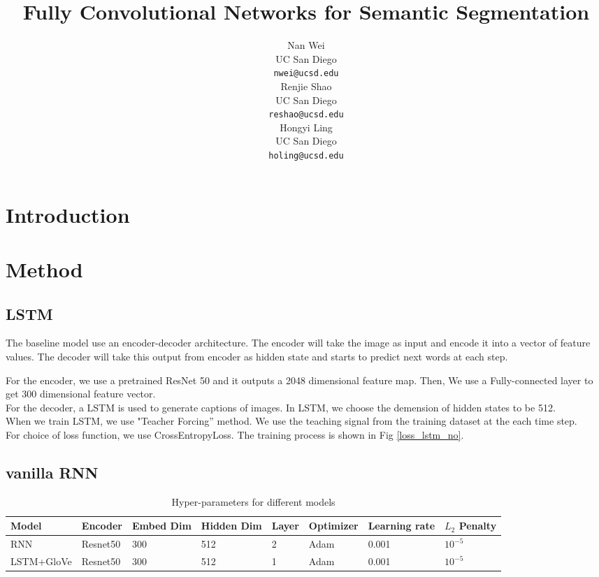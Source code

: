 \documentclass{article} %
\title{Fully Convolutional Networks for Semantic
Segmentation}
\author{
Nan Wei \\
UC San Diego\\
\texttt{nwei@ucsd.edu} \\
\And
Renjie Shao \\
UC San Diego \\
\texttt{reshao@ucsd.edu} \\
\And
Hongyi Ling \\
UC San Diego \\
\texttt{holing@ucsd.edu} \\
}
\begin{document}
\maketitle

\begin{abstract}

\end{abstract}

\section{Introduction}


\section{Method}
\subsection{LSTM}
The baseline model use an encoder-decoder architecture. 
The encoder will take the image as input and encode it into a vector of feature values.
 The decoder will take this output from encoder as hidden state and starts to predict next words at each step.

 For the encoder, we use a pretrained ResNet 50 and it outputs a  2048 dimensional feature map. Then, We use a Fully-connected layer to get 300 dimensional feature vector. \\
 For the decoder, a LSTM is used to generate captions of images. In LSTM, we choose the demension of hidden states to be 512. \\
 When we train LSTM, we use "Teacher Forcing” method. We use the teaching signal from the training dataset at the each time step.\\
 For choice of loss function, we use CrossEntropyLoss. The training process is shown in Fig \ref{loss_lstm_no}.
\subsection{vanilla RNN}

\begin{table}[!htb]
    \centering
    \begin{tabular}{l|l|l|l|l|l|l|l}
        \hline
        Model & Encoder & Embed Dim & Hidden Dim & Layer &  Optimizer & Learning rate & $L_2$ Penalty \\
		\hline
        RNN & Resnet50 & 300 & 512 & 2 & Adam & 0.001 & $10^{-5}$ \\
	    \hline
		LSTM+GloVe& Resnet50 & 300 & 512 & 1 & Adam & 0.001 & $10^{-5}$ \\
	    \hline
    \end{tabular}
    \caption{Hyper-parameters for different models}
    \label{acc}
\end{table}
\end{document}
